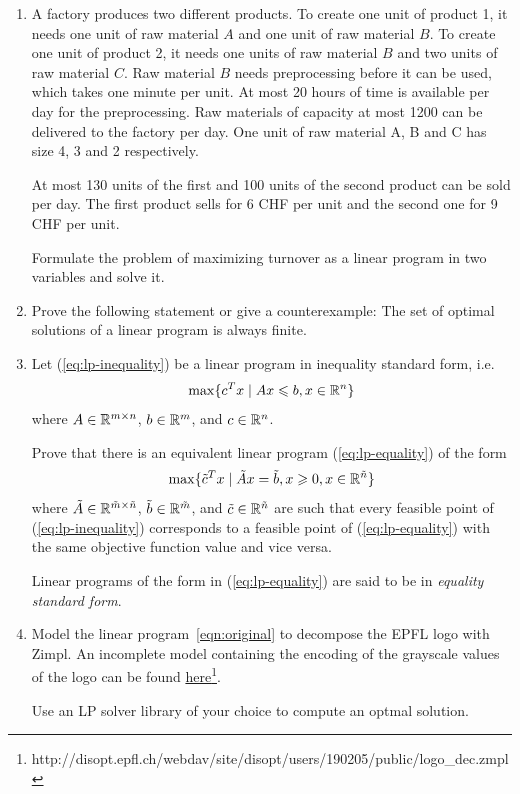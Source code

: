 \begin{enumerate}[1)]
  
\item A factory produces two different products.
To create one unit of product 1, it needs one unit of raw material $A$
and one unit of raw material $B$.
To create one unit of product 2, it needs one units of raw material $B$ and
two units of raw material $C$.
Raw material $B$ needs preprocessing before it can be used, which takes
one minute per unit. 
At most 20 hours of time is available per day for the preprocessing.
Raw materials of capacity at most 1200 can be delivered to the factory per day. 
One unit of raw material A, B and C has size 4, 3 and 2 respectively. 

At most 130 units of the first and 100 units of the second product can be sold
per day. The first product sells for 6 CHF per unit and the second one
for 9 CHF per unit.

Formulate the problem of maximizing turnover as a linear program in two variables and solve it.

\item Prove the following statement or give a counterexample:
The set of optimal solutions of a linear program is always finite.
\item Let (\ref{eq:lp-inequality}) be a linear program in inequality standard form, i.e.
\begin{equation} \label{eq:lp-inequality}
\max\{ c^T x \mid Ax \leqslant b, x \in \mathbb{R}^n \}
\end{equation}
where $A \in \mathbb{R}^{m \times n}$, $b\in \mathbb{R}^m$, and $c\in\mathbb{R}^n$.

Prove that there is an equivalent linear program (\ref{eq:lp-equality}) of the form
\begin{equation} \label{eq:lp-equality}
\max\{ \tilde c^T x \mid \tilde Ax = \tilde b, x \geqslant 0, x \in \mathbb{R}^{\tilde n} \}
\end{equation}
where $\tilde A \in \mathbb{R}^{\tilde m \times \tilde n}$, $\tilde b \in \mathbb{R}^{\tilde m}$, and $\tilde c \in \mathbb{R}^{\tilde n}$
are such that every feasible point of (\ref{eq:lp-inequality}) corresponds to a feasible point of (\ref{eq:lp-equality})
with the same objective function value and vice versa.

Linear programs of the form in (\ref{eq:lp-equality}) are said to be in \emph{equality standard form}.

\item  Model the linear program~\eqref{eqn:original} to decompose the EPFL logo with Zimpl. 
An incomplete model containing the encoding of the grayscale values of the logo can be found \href{http://disopt.epfl.ch/webdav/site/disopt/users/190205/public/logo\_dec.zmpl}{here}\footnote{http://disopt.epfl.ch/webdav/site/disopt/users/190205/public/logo\_dec.zmpl}.

Use an LP solver library of your choice to compute an optmal solution.

\end{enumerate}


% 

% 


